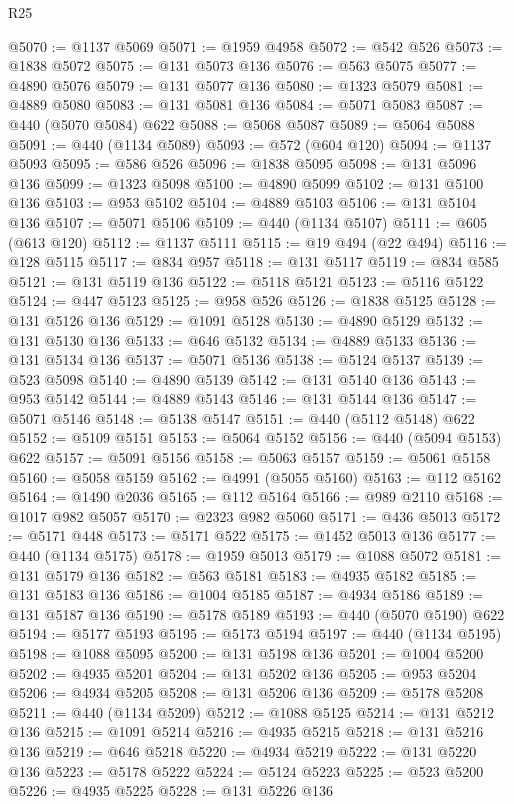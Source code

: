 \begin{lexlean}{R25}
\begin{coremodule}
@5070 := @1137 @5069
@5071 := @1959 @4958
@5072 := @542 @526
@5073 := @1838 @5072
@5075 := @131 @5073 @136
@5076 := @563 @5075
@5077 := @4890 @5076
@5079 := @131 @5077 @136
@5080 := @1323 @5079
@5081 := @4889 @5080
@5083 := @131 @5081 @136
@5084 := @5071 @5083
@5087 := @440 (@5070 @5084) @622
@5088 := @5068 @5087
@5089 := @5064 @5088
@5091 := @440 (@1134 @5089)
@5093 := @572 (@604 @120)
@5094 := @1137 @5093
@5095 := @586 @526
@5096 := @1838 @5095
@5098 := @131 @5096 @136
@5099 := @1323 @5098
@5100 := @4890 @5099
@5102 := @131 @5100 @136
@5103 := @953 @5102
@5104 := @4889 @5103
@5106 := @131 @5104 @136
@5107 := @5071 @5106
@5109 := @440 (@1134 @5107)
@5111 := @605 (@613 @120)
@5112 := @1137 @5111
@5115 := @19 @494 (@22 @494)
@5116 := @128 @5115
@5117 := @834 @957
@5118 := @131 @5117
@5119 := @834 @585
@5121 := @131 @5119 @136
@5122 := @5118 @5121
@5123 := @5116 @5122
@5124 := @447 @5123
@5125 := @958 @526
@5126 := @1838 @5125
@5128 := @131 @5126 @136
@5129 := @1091 @5128
@5130 := @4890 @5129
@5132 := @131 @5130 @136
@5133 := @646 @5132
@5134 := @4889 @5133
@5136 := @131 @5134 @136
@5137 := @5071 @5136
@5138 := @5124 @5137
@5139 := @523 @5098
@5140 := @4890 @5139
@5142 := @131 @5140 @136
@5143 := @953 @5142
@5144 := @4889 @5143
@5146 := @131 @5144 @136
@5147 := @5071 @5146
@5148 := @5138 @5147
@5151 := @440 (@5112 @5148) @622
@5152 := @5109 @5151
@5153 := @5064 @5152
@5156 := @440 (@5094 @5153) @622
@5157 := @5091 @5156
@5158 := @5063 @5157
@5159 := @5061 @5158
@5160 := @5058 @5159
@5162 := @4991 (@5055 @5160)
@5163 := @112 @5162
@5164 := @1490 @2036
@5165 := @112 @5164
@5166 := @989 @2110
@5168 := @1017 @982 @5057
@5170 := @2323 @982 @5060
@5171 := @436 @5013
@5172 := @5171 @448
@5173 := @5171 @522
@5175 := @1452 @5013 @136
@5177 := @440 (@1134 @5175)
@5178 := @1959 @5013
@5179 := @1088 @5072
@5181 := @131 @5179 @136
@5182 := @563 @5181
@5183 := @4935 @5182
@5185 := @131 @5183 @136
@5186 := @1004 @5185
@5187 := @4934 @5186
@5189 := @131 @5187 @136
@5190 := @5178 @5189
@5193 := @440 (@5070 @5190) @622
@5194 := @5177 @5193
@5195 := @5173 @5194
@5197 := @440 (@1134 @5195)
@5198 := @1088 @5095
@5200 := @131 @5198 @136
@5201 := @1004 @5200
@5202 := @4935 @5201
@5204 := @131 @5202 @136
@5205 := @953 @5204
@5206 := @4934 @5205
@5208 := @131 @5206 @136
@5209 := @5178 @5208
@5211 := @440 (@1134 @5209)
@5212 := @1088 @5125
@5214 := @131 @5212 @136
@5215 := @1091 @5214
@5216 := @4935 @5215
@5218 := @131 @5216 @136
@5219 := @646 @5218
@5220 := @4934 @5219
@5222 := @131 @5220 @136
@5223 := @5178 @5222
@5224 := @5124 @5223
@5225 := @523 @5200
@5226 := @4935 @5225
@5228 := @131 @5226 @136

\end{coremodule}
\end{lexlean}
